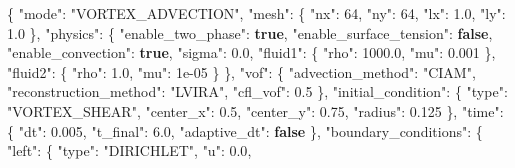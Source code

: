 \documentclass[
  10pt,
]{article}
\newenvironment{Shaded}{}{}
\newcommand{\DataTypeTok}[1]{\textcolor[rgb]{0.56,0.13,0.00}{#1}}
\newcommand{\DecValTok}[1]{\textcolor[rgb]{0.25,0.63,0.44}{#1}}
\newcommand{\FloatTok}[1]{\textcolor[rgb]{0.25,0.63,0.44}{#1}}
\newcommand{\FunctionTok}[1]{\textcolor[rgb]{0.02,0.16,0.49}{#1}}
\newcommand{\KeywordTok}[1]{\textcolor[rgb]{0.00,0.44,0.13}{\textbf{#1}}}
\newcommand{\StringTok}[1]{\textcolor[rgb]{0.25,0.44,0.63}{#1}}
\begin{document}
\begin{Shaded}
\begin{Highlighting}[]
\FunctionTok{\{}
  \DataTypeTok{"mode"}\FunctionTok{:} \StringTok{"VORTEX\_ADVECTION"}\FunctionTok{,}
  \DataTypeTok{"mesh"}\FunctionTok{:} \FunctionTok{\{}
    \DataTypeTok{"nx"}\FunctionTok{:} \DecValTok{64}\FunctionTok{,}
    \DataTypeTok{"ny"}\FunctionTok{:} \DecValTok{64}\FunctionTok{,}
    \DataTypeTok{"lx"}\FunctionTok{:} \FloatTok{1.0}\FunctionTok{,}
    \DataTypeTok{"ly"}\FunctionTok{:} \FloatTok{1.0}
  \FunctionTok{\},}
  \DataTypeTok{"physics"}\FunctionTok{:} \FunctionTok{\{}
    \DataTypeTok{"enable\_two\_phase"}\FunctionTok{:} \KeywordTok{true}\FunctionTok{,}
    \DataTypeTok{"enable\_surface\_tension"}\FunctionTok{:} \KeywordTok{false}\FunctionTok{,}
    \DataTypeTok{"enable\_convection"}\FunctionTok{:} \KeywordTok{true}\FunctionTok{,}
    \DataTypeTok{"sigma"}\FunctionTok{:} \FloatTok{0.0}\FunctionTok{,}
    \DataTypeTok{"fluid1"}\FunctionTok{:} \FunctionTok{\{}
      \DataTypeTok{"rho"}\FunctionTok{:} \FloatTok{1000.0}\FunctionTok{,}
      \DataTypeTok{"mu"}\FunctionTok{:} \FloatTok{0.001}
    \FunctionTok{\},}
    \DataTypeTok{"fluid2"}\FunctionTok{:} \FunctionTok{\{}
      \DataTypeTok{"rho"}\FunctionTok{:} \FloatTok{1.0}\FunctionTok{,}
      \DataTypeTok{"mu"}\FunctionTok{:} \DecValTok{1e{-}05}
    \FunctionTok{\}}
  \FunctionTok{\},}
  \DataTypeTok{"vof"}\FunctionTok{:} \FunctionTok{\{}
    \DataTypeTok{"advection\_method"}\FunctionTok{:} \StringTok{"CIAM"}\FunctionTok{,}
    \DataTypeTok{"reconstruction\_method"}\FunctionTok{:} \StringTok{"LVIRA"}\FunctionTok{,}
    \DataTypeTok{"cfl\_vof"}\FunctionTok{:} \FloatTok{0.5}
  \FunctionTok{\},}
  \DataTypeTok{"initial\_condition"}\FunctionTok{:} \FunctionTok{\{}
    \DataTypeTok{"type"}\FunctionTok{:} \StringTok{"VORTEX\_SHEAR"}\FunctionTok{,}
    \DataTypeTok{"center\_x"}\FunctionTok{:} \FloatTok{0.5}\FunctionTok{,}
    \DataTypeTok{"center\_y"}\FunctionTok{:} \FloatTok{0.75}\FunctionTok{,}
    \DataTypeTok{"radius"}\FunctionTok{:} \FloatTok{0.125}
  \FunctionTok{\},}
  \DataTypeTok{"time"}\FunctionTok{:} \FunctionTok{\{}
    \DataTypeTok{"dt"}\FunctionTok{:} \FloatTok{0.005}\FunctionTok{,}
    \DataTypeTok{"t\_final"}\FunctionTok{:} \FloatTok{6.0}\FunctionTok{,}
    \DataTypeTok{"adaptive\_dt"}\FunctionTok{:} \KeywordTok{false}
  \FunctionTok{\},}
  \DataTypeTok{"boundary\_conditions"}\FunctionTok{:} \FunctionTok{\{}
    \DataTypeTok{"left"}\FunctionTok{:} \FunctionTok{\{}
      \DataTypeTok{"type"}\FunctionTok{:} \StringTok{"DIRICHLET"}\FunctionTok{,}
      \DataTypeTok{"u"}\FunctionTok{:} \FloatTok{0.0}\FunctionTok{,}

\end{Highlighting}
\end{Shaded}
\end{document}
